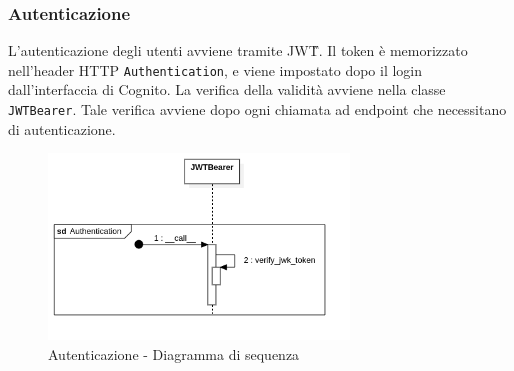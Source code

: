 \subsubsection{Autenticazione}
L'autenticazione degli utenti avviene tramite JWT\G{}. Il token è memorizzato nell'header HTTP \verb|Authentication|,
e viene impostato dopo il login dall'interfaccia di Cognito. La verifica della validità avviene nella classe \verb|JWTBearer|.
Tale verifica avviene dopo ogni chiamata ad endpoint che necessitano di autenticazione.
\begin{figure}[H]
    \includegraphics[width=8cm]{sezioni/images/sd_api_auth.png}
    \centering
    \caption{Autenticazione - Diagramma di sequenza}
\end{figure}
